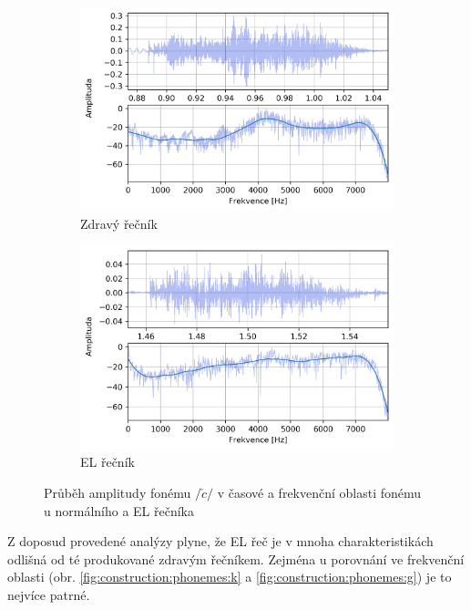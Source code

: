 \begin{figure}[htpb]
  \centering
  \begin{subfigure}[b]{0.45\textwidth}
    \includegraphics[width=\textwidth]{./ch5-construction/img/signal-normal_c.png}
    \caption{Zdravý řečník}
    \label{fig:construction:phonemes:c:normal}
  \end{subfigure}
  \begin{subfigure}[b]{0.45\textwidth}
    \includegraphics[width=\textwidth]{./ch5-construction/img/signal-el_c.png}
    \caption{EL řečník}
    \label{fig:construction:phonemes:c:el}
  \end{subfigure}
  \caption{Průběh amplitudy fonému $/\check{c}/$ v časové a frekvenční oblasti fonému u normálního a EL řečníka}
  \label{fig:construction:phonemes:c}
\end{figure}

Z doposud provedené analýzy plyne, že EL řeč je v mnoha charakteristikách odlišná od té produkované zdravým řečníkem. Zejména u porovnání ve frekvenční oblasti (obr. \ref{fig:construction:phonemes:k} a \ref{fig:construction:phonemes:g}) je to nejvíce patrné.

